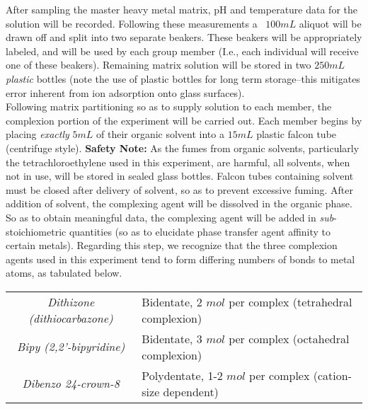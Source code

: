 \documentclass[letterpaper,12pt]{article}
\begin{document}
	\indent
	After sampling the master heavy metal matrix, pH and temperature data for the solution will be recorded. Following these measurements a ~$100mL$ aliquot will be drawn off and split into two separate beakers. These beakers will be appropriately labeled, and will be used by each group member (I.e., each individual will receive one of these beakers). Remaining matrix solution will be stored in two $250mL$ \emph{plastic} bottles (note the use of plastic bottles for long term storage--this mitigates error inherent from ion adsorption onto glass surfaces).
	\\
	\indent
	Following matrix partitioning so as to supply solution to each member, the complexion portion of the experiment will be carried out. Each member begins by placing \emph{exactly} $5mL$ of their organic solvent into a $15mL$ plastic falcon tube (centrifuge style). \textbf{Safety Note:} As the fumes from organic solvents, particularly the tetrachloroethylene used in this experiment, are harmful, all solvents, when not in use, will be stored in sealed glass bottles. Falcon tubes containing solvent must be closed after delivery of solvent, so as to prevent excessive fuming. After addition of solvent, the complexing agent will be dissolved in the organic phase. So as to obtain meaningful data, the complexing agent will be added in \emph{sub}-stoichiometric quantities (so as to elucidate phase transfer agent affinity to certain metals). Regarding this step, we recognize that the three complexion agents used in this experiment tend to form differing numbers of bonds to metal atoms, as tabulated below.  
	\begin{center}
		\begin{tabular}[htbp]{c@{ : }l}
			\emph{Dithizone (dithiocarbazone)} & Bidentate, 2 $mol$ per complex (tetrahedral complexion)\\
			\emph{Bipy (2,2'-bipyridine)} & Bidentate, 3 $mol$ per complex (octahedral complexion)\\
			\emph{Dibenzo 24-crown-8} & Polydentate, 1-2 $mol$ per complex (cation-size dependent)
		\end{tabular}
	\end{center}
	
\end{document}
